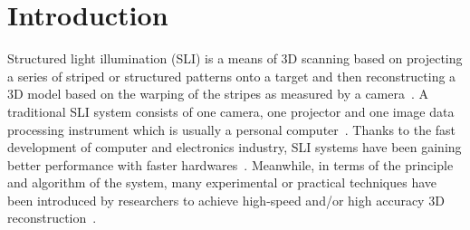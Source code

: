 \documentclass[10pt,letterpaper]{article}
\begin{document}
%


\section{Introduction}
Structured light illumination (SLI) is a means of 3D scanning based on projecting a series of striped or structured patterns onto a target and then reconstructing a 3D model based on the warping of the stripes as measured by a camera~\cite{inde78, posd82, boye87}.  A traditional SLI system consists of one camera, one projector and one image data processing instrument which is usually a personal computer~\cite{gort10}. Thanks to the fast development of computer and electronics industry, SLI systems have been gaining better performance with faster hardwares~\cite{gong10, zhan17}. Meanwhile, in terms of the principle and algorithm of the system, many experimental or practical techniques have been introduced by researchers to achieve high-speed and/or high accuracy 3D reconstruction~\cite{zhan17, zhan06}. 
\end{document}
